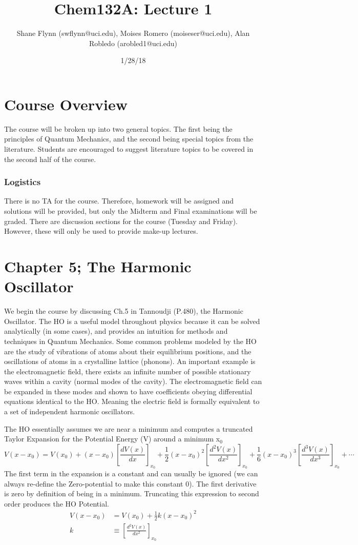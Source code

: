 \documentclass{article}
\title{Chem132A: Lecture 1}
\author{Shane Flynn (swflynn@uci.edu), Moises Romero (moiseser@uci.edu), Alan Robledo (arobled1@uci.edu)}
\date{1/28/18}
\newcommand{\be}{\begin{equation}}
\newcommand{\ee}{\end{equation}}
\begin{document}
\maketitle

\section*{Course Overview}
The course will be broken up into two general topics.
The first being the principles of Quantum Mechanics, and the second being special topics from the literature.
Students are encouraged to suggest literature topics to be covered in the second half of the course.

\subsubsection*{Logistics}
There is no TA for the course. Therefore, homework will be assigned and solutions will be provided, but only the Midterm and Final examinations will be graded.
There are discussion sections for the course (Tuesday and Friday). However, these will only be used to provide make-up lectures.

\section*{Chapter 5; The Harmonic Oscillator}
We begin the course by discussing Ch.5 in Tannoudji (P.480), the Harmonic Oscillator.
The HO is a useful model throughout physics because it can be solved analytically (in some cases), and provides an intuition for methods and techniques in Quantum Mechanics.
Some common problems modeled by the HO are the study of vibrations of atoms about their equilibrium positions, and the oscillations of atoms in a crystalline lattice (phonons).
An important example is the electromagnetic field, there  exists an  infinite number of possible stationary waves within a cavity (normal modes of the cavity).
The electromagnetic field can be expanded in these modes and shown to have coefficients obeying differential equations identical to the HO.
Meaning the electric field is formally equivalent to a set of independent harmonic oscillators.

The HO essentially assumes we are near a minimum and computes a truncated Taylor Expansion for the Potential Energy (V) around a minimum x$_0$
\be
V(x - x_0) = V(x_0)  + (x-x_0) \left[\frac{dV(x)}{dx}\right]_{x_0} + \frac{1}{2}(x-x_0)^2  \left[\frac{d^2V(x)}{dx^2}\right]_{x_0} + \frac{1}{6} (x-x_0)^3  \left[\frac{d^3V(x)}{dx^3}\right]_{x_0} + \cdots
\ee
The first term in the expansion is a constant and can usually be ignored (we can always re-define the Zero-potential to make this constant 0).
The first derivative is zero by definition of being in a minimum.
Truncating this expression to second order produces the HO Potential.
\be
\begin{split}
    V(x-x_0) &= V(x_0) +  \frac{1}{2}k(x-x_0)^2\\
    k &\equiv \left[\frac{d^2V(x)}{dx^2}\right]_{x_0}
\end{split}
\ee
\end{document}
